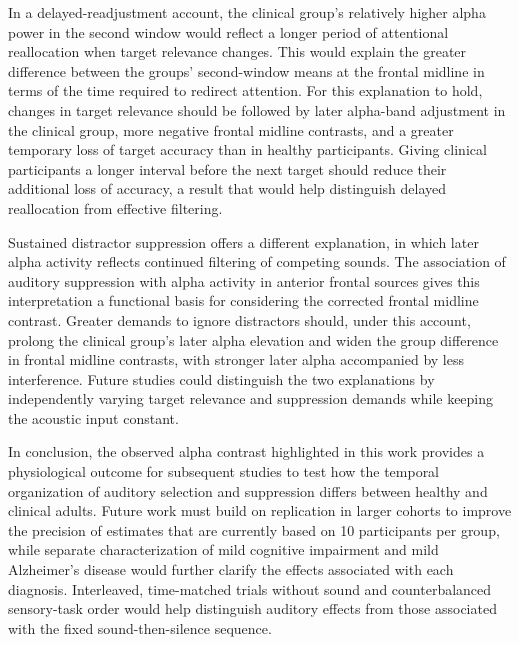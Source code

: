 \documentclass[11pt,letterpaper]{article}
\begin{document}
In a delayed-readjustment account, the clinical group's relatively higher alpha power in the second window would reflect a longer period of attentional reallocation when target relevance changes. This would explain the greater difference between the groups' second-window means at the frontal midline in terms of the time required to redirect attention. For this explanation to hold, changes in target relevance should be followed by later alpha-band adjustment in the clinical group, more negative frontal midline contrasts, and a greater temporary loss of target accuracy than in healthy participants. Giving clinical participants a longer interval before the next target should reduce their additional loss of accuracy, a result that would help distinguish delayed reallocation from effective filtering.

Sustained distractor suppression offers a different explanation, in which later alpha activity reflects continued filtering of competing sounds. The association of auditory suppression with alpha activity in anterior frontal sources \cite{wostmann} gives this interpretation a functional basis for considering the corrected frontal midline contrast. Greater demands to ignore distractors should, under this account, prolong the clinical group's later alpha elevation and widen the group difference in frontal midline contrasts, with stronger later alpha accompanied by less interference. Future studies could distinguish the two explanations by independently varying target relevance and suppression demands while keeping the acoustic input constant.

In conclusion, the observed alpha contrast highlighted in this work provides a physiological outcome for subsequent studies to test how the temporal organization of auditory selection and suppression differs between healthy and clinical adults. Future work must build on replication in larger cohorts to improve the precision of estimates that are currently based on 10 participants per group, while separate characterization of mild cognitive impairment and mild Alzheimer's disease would further clarify the effects associated with each diagnosis. Interleaved, time-matched trials without sound and counterbalanced sensory-task order would help distinguish auditory effects from those associated with the fixed sound-then-silence sequence.
\end{document}
